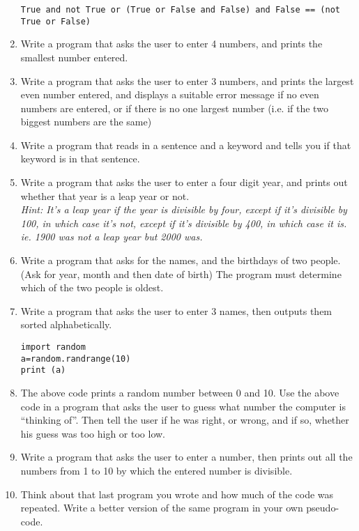 \begin{enumerate}
\begin{lstlisting}
True and not True or (True or False and False) and False == (not True or False)
\end{lstlisting}
	\item Write a program that asks the user to enter 4 numbers, and
			prints the smallest number entered.
	\item Write a program that asks the user to enter 3 numbers, and
			prints the largest even number entered, and displays a suitable error message if no even numbers are entered, or if there is no one largest number (i.e. if the two biggest numbers are the same)
	\item Write a program that reads in a sentence and a keyword and tells you if that keyword is in that sentence.
	\item Write a program that asks the user to enter a four digit year,
			and prints out whether that year is a leap year or not. \\
\textit{Hint: It's a leap year if the year is divisible by four, except if it's divisible by 100, in which case it's not, except if it's divisible by 400, in which case it is. ie. 1900 was not a leap year but 2000 was.}
	\item Write a program that asks for the names, and the birthdays of two people. (Ask for year, month and then date of birth) The program must determine which of the two people is oldest.
	\item Write a program that asks the user to enter 3 names, then
			outputs them sorted alphabetically.
	
\begin{lstlisting}
import random
a=random.randrange(10)
print (a)
\end{lstlisting} 
\item The above code prints a random number between 0 and 10. Use the above code in a program that asks the user to guess what number the computer is ``thinking of''. Then tell the user if he was right, or wrong, and if so, whether his guess was too high or too low.
	\item Write a program that asks the user to enter a number, then
			prints out all the numbers from 1 to 10 by which the entered number
			is divisible.
	\item Think about that last program you wrote and how much of the code was repeated. Write a better version of the same program in your own pseudo-code.

		
\end{enumerate}    
